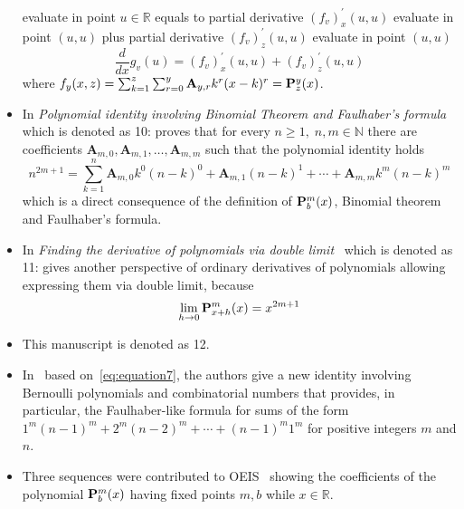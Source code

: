 \begin{itemize}
    evaluate in point $u\in\mathbb{R}$ equals to partial derivative $(f_{v})^{'}_{x} (u, u)$ evaluate in point $(u, u)$ plus
    partial derivative $(f_{v})^{'}_{z} (u, u)$ evaluate in point $(u, u)$
    \begin{equation}
        \frac{d}{dx} g_v (u) = (f_{v})^{'}_{x} (u, u) + (f_{v})^{'}_{z} (u, u)
        \label{eq:odd-exponential-identity}
    \end{equation}
    where $f_{y} (x, z) = \sum_{k=1}^{z} \sum_{r=0}^{y} {\mathbf{A}} \sb{y,r} k^r (x-k)^r = {\mathbf{P}}\sp{y} \sb{z}(x)$.
    \item In \textit{Polynomial identity involving Binomial Theorem and Faulhaber's formula}~\cite{kolosov2023polynomial}
    which is denoted as 10: proves that
    for every $n\geq 1, \; n,m\in\mathbb{N}$
    there are coefficients $\mathbf{A}_{m,0}, \mathbf{A}_{m,1}, \ldots, \mathbf{A}_{m,m}$ such that
    the polynomial identity holds
    \[
        n^{2m+1} = \sum_{k=1}^{n} \mathbf{A}_{m,0} k^0 (n-k)^0 + \mathbf{A}_{m,1}(n-k)^1
        + \cdots + \mathbf{A}_{m,m} k^m (n-k)^m
    \]
    which is a direct consequence of the definition of ${\mathbf{P}}\sp{m} \sb{b}(x)$, Binomial theorem and Faulhaber's formula.
    \item In \textit{Finding the derivative of polynomials via double limit}~\cite{kolosov_2024_10575485}
    which is denoted as 11: gives another perspective of ordinary derivatives of polynomials allowing expressing
    them via double limit, because
    \begin{align*}
        \lim_{h \to 0} {\mathbf{P}}\sp{m} \sb{x+h}(x) = x^{2m+1}
    \end{align*}
    \item This manuscript is denoted as 12.
    \item In~\cite{barbero2020two} based on~\eqref{eq:equation7}, the authors give a new identity involving
    Bernoulli polynomials and combinatorial numbers that provides,
    in particular, the Faulhaber-like formula for sums of the form $1^m(n-1)^m + 2^m (n -2)^m + \cdots + (n - 1)^m 1^m$
    for positive integers $m$ and $n$.
    \item Three sequences were contributed to
    OEIS~\cite{kolosov2018coefficientspolynomial1, kolosov2018coefficientspolynomial2, kolosov2018coefficientspolynomial3}
    showing the coefficients of the polynomial ${\mathbf{P}}\sp{m} \sb{b}(x)$ having fixed points $m,b$ while $x\in\mathbb{R}$.
\end{itemize}
